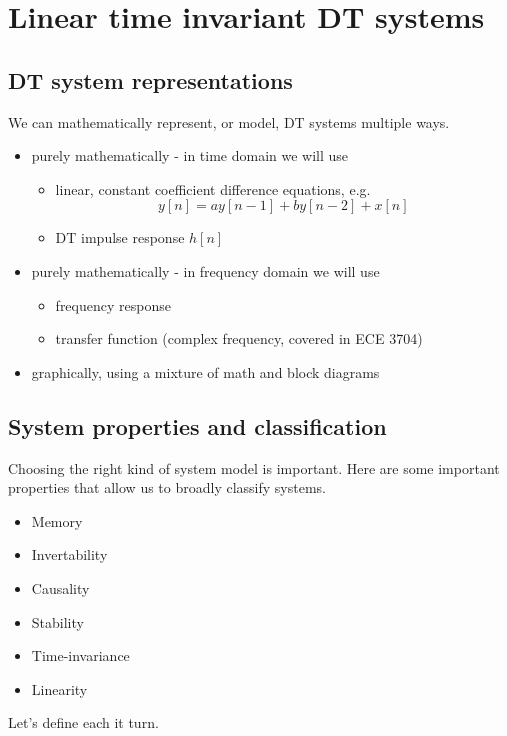 \section{Linear time invariant DT systems}

\subsection{DT system representations}

We can mathematically represent, or model, DT systems multiple ways.

\begin{itemize}
\item purely mathematically - in time domain we will use

  \begin{itemize}
  \item linear, constant coefficient difference equations, e.g.
    \[
    y[n] = a y[n-1] + b y[n-2] + x[n]
    \]
  \item DT impulse response $h[n]$
  \end{itemize}
\item purely mathematically - in frequency domain we will use
  \begin{itemize}
  \item frequency response
  \item transfer function (complex frequency, covered in ECE 3704)
  \end{itemize}
\item graphically, using a mixture of math and block diagrams
\end{itemize}

\subsection{System properties and classification}

Choosing the right kind of system model is important. Here are some important properties that allow us to broadly classify systems.
\begin{itemize}
\item Memory
\item Invertability
\item Causality
\item Stability
\item Time-invariance
\item Linearity
\end{itemize}

Let's define each it turn.

